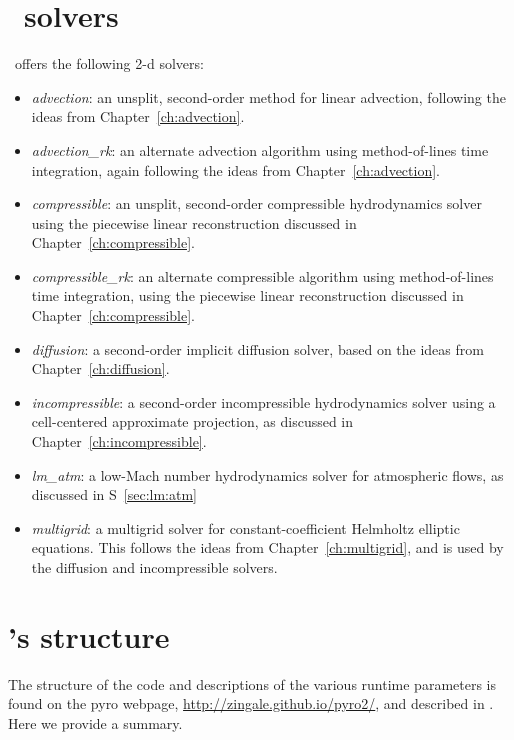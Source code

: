 \section{\pyro\ solvers}

\pyro\ offers the following 2-d solvers:
\begin{itemize}
\item {\em advection}: an unsplit, second-order method for linear advection,
  following the ideas from Chapter~\ref{ch:advection}.

\item {\em advection\_rk}: an alternate advection algorithm using
  method-of-lines time integration, again following the ideas
  from Chapter~\ref{ch:advection}.

\item {\em compressible}: an unsplit, second-order compressible
  hydrodynamics solver using the piecewise linear reconstruction
  discussed in Chapter~\ref{ch:compressible}.

\item {\em compressible\_rk}: an alternate compressible algorithm
  using method-of-lines time integration, using the piecewise
  linear reconstruction discussed in Chapter~\ref{ch:compressible}.

\item {\em diffusion}: a second-order implicit diffusion solver, based
  on the ideas from Chapter~\ref{ch:diffusion}.

\item {\em incompressible}: a second-order incompressible hydrodynamics
  solver using a cell-centered approximate projection, as discussed
  in Chapter~\ref{ch:incompressible}.

\item {\em lm\_atm}: a low-Mach number hydrodynamics solver for
  atmospheric flows, as discussed in S~\ref{sec:lm:atm}
  
\item {\em multigrid}: a multigrid solver for constant-coefficient Helmholtz
  elliptic equations.  This follows the ideas from Chapter~\ref{ch:multigrid},
  and is used by the diffusion and incompressible solvers.

\end{itemize}

\section{\pyro 's structure}

The structure of the code and descriptions of the various runtime
parameters is found on the pyro webpage,
\url{http://zingale.github.io/pyro2/}, and described
in \cite{pyro}.  Here we provide a summary.

